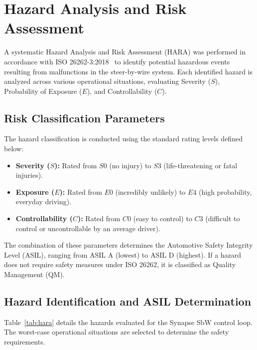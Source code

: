 \section{Hazard Analysis and Risk Assessment}
\label{sec:hara}

A systematic Hazard Analysis and Risk Assessment (HARA) was performed in accordance with ISO 26262-3:2018~\cite{ISO26262_2018} to identify potential hazardous events resulting from malfunctions in the steer-by-wire system. Each identified hazard is analyzed across various operational situations, evaluating Severity ($S$), Probability of Exposure ($E$), and Controllability ($C$).

\subsection{Risk Classification Parameters}
The hazard classification is conducted using the standard rating levels defined below:
\begin{itemize}
    \item \textbf{Severity ($S$):} Rated from $S0$ (no injury) to $S3$ (life-threatening or fatal injuries).
    \item \textbf{Exposure ($E$):} Rated from $E0$ (incredibly unlikely) to $E4$ (high probability, everyday driving).
    \item \textbf{Controllability ($C$):} Rated from $C0$ (easy to control) to $C3$ (difficult to control or uncontrollable by an average driver).
\end{itemize}
The combination of these parameters determines the Automotive Safety Integrity Level (ASIL), ranging from ASIL A (lowest) to ASIL D (highest). If a hazard does not require safety measures under ISO 26262, it is classified as Quality Management (QM).

\subsection{Hazard Identification and ASIL Determination}
Table~\ref{tab:hara} details the hazards evaluated for the Synapse SbW control loop. The worst-case operational situations are selected to determine the safety requirements.

